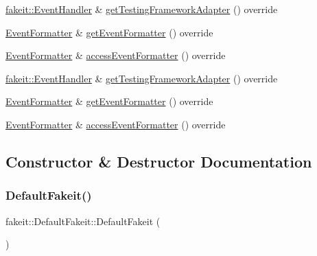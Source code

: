 \begin{DoxyCompactItemize}
\item 
\mbox{\hyperlink{structfakeit_1_1EventHandler}{fakeit\+::\+Event\+Handler}} \& \mbox{\hyperlink{classfakeit_1_1DefaultFakeit_af01d86eee74123b4794c07aac3767ad7}{get\+Testing\+Framework\+Adapter}} () override
\item 
\mbox{\hyperlink{structfakeit_1_1EventFormatter}{Event\+Formatter}} \& \mbox{\hyperlink{classfakeit_1_1DefaultFakeit_ae06b5536bcde628ed7e32499eb8b9ac3}{get\+Event\+Formatter}} () override
\item 
\mbox{\hyperlink{structfakeit_1_1EventFormatter}{Event\+Formatter}} \& \mbox{\hyperlink{classfakeit_1_1DefaultFakeit_a02cb8f08a94e7bf830c87f74f20c9bd9}{access\+Event\+Formatter}} () override
\item 
\mbox{\hyperlink{structfakeit_1_1EventHandler}{fakeit\+::\+Event\+Handler}} \& \mbox{\hyperlink{classfakeit_1_1DefaultFakeit_af01d86eee74123b4794c07aac3767ad7}{get\+Testing\+Framework\+Adapter}} () override
\item 
\mbox{\hyperlink{structfakeit_1_1EventFormatter}{Event\+Formatter}} \& \mbox{\hyperlink{classfakeit_1_1DefaultFakeit_ae06b5536bcde628ed7e32499eb8b9ac3}{get\+Event\+Formatter}} () override
\item 
\mbox{\hyperlink{structfakeit_1_1EventFormatter}{Event\+Formatter}} \& \mbox{\hyperlink{classfakeit_1_1DefaultFakeit_a02cb8f08a94e7bf830c87f74f20c9bd9}{access\+Event\+Formatter}} () override
\end{DoxyCompactItemize}


\subsection{Constructor \& Destructor Documentation}
\mbox{\label{classfakeit_1_1DefaultFakeit_a80d5ef87779c5d3b4e9518ba39e5999f}} 
\subsubsection{\texorpdfstring{DefaultFakeit()}{DefaultFakeit()}\hspace{0.1cm}{\footnotesize\ttfamily [1/9]}}
{\footnotesize\ttfamily fakeit\+::\+Default\+Fakeit\+::\+Default\+Fakeit (\begin{DoxyParamCaption}{ }\end{DoxyParamCaption})\hspace{0.3cm}{\ttfamily [inline]}}

